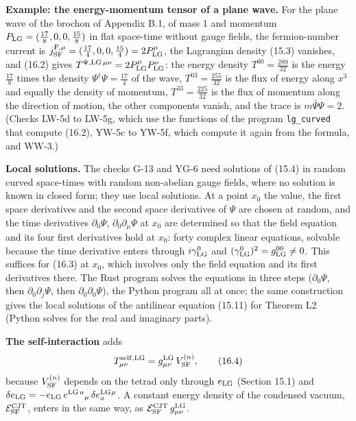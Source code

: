 \documentclass[
  10pt,
]{article}
\begin{document}
\textbf{Example: the energy-momentum tensor of a plane wave.} For the
plane wave of the brochon of Appendix B.1, of mass 1 and momentum
\(P_{\rm LG}=(\tfrac{17}{8},0,0,\tfrac{15}{8})\) in flat space-time
without gauge fields, the fermion-number current is
\(j^{{\rm F},\mu}_{\rm SF}=(\tfrac{17}{4},0,0,\tfrac{15}{4})=2P^\mu_{\rm LG}\),
the Lagrangian density (15.3) vanishes, and (16.2) gives
\(T^{\Psi,{\rm LG}\,\mu\nu}=2P^\mu_{\rm LG}P^\nu_{\rm LG}\): the energy
density \(T^{00}=\tfrac{289}{32}\) is the energy \(\tfrac{17}8\) times
the density \(\Psi^\dagger\Psi=\tfrac{17}4\) of the wave,
\(T^{03}=\tfrac{255}{32}\) is the flux of energy along \(x^3\) and
equally the density of momentum, \(T^{33}=\tfrac{225}{32}\) is the flux
of momentum along the direction of motion, the other components vanish,
and the trace is \(m\bar\Psi\Psi=2\). (Checks LW-5d to LW-5g, which use
the functions of the program \texttt{lg\_curved} that compute (16.2),
YW-5c to YW-5f, which compute it again from the formula, and WW-3.)

\textbf{Local solutions.} The checks G-13 and YG-6 need solutions of
(15.4) in random curved space-times with random non-abelian gauge
fields, where no solution is known in closed form; they use local
solutions. At a point \(x_0\) the value, the first space derivatives and
the second space derivatives of \(\Psi\) are chosen at random, and the
time derivatives \(\partial_0\Psi\), \(\partial_0\partial_\mu\Psi\) at
\(x_0\) are determined so that the field equation and its four first
derivatives hold at \(x_0\): forty complex linear equations, solvable
because the time derivative enters through \(i\gamma^0_{\rm LG}\) and
\((\gamma^0_{\rm LG})^2=g_{\rm LG}^{00}\ne0\). This suffices for (16.3)
at \(x_0\), which involves only the field equation and its first
derivatives there. The Rust program solves the equations in three steps
(\(\partial_0\Psi\), then \(\partial_0\partial_j\Psi\), then
\(\partial_0\partial_0\Psi\)), the Python program all at once; the same
construction gives the local solutions of the antilinear equation
(15.11) for Theorem L2 (Python solves for the real and imaginary parts).

\textbf{The self-interaction} adds
\[T^{\rm self,LG}_{\mu\nu}=g^{\rm LG}_{\mu\nu}\,V^{(n)}_{\rm SF},\tag{16.4}\]
because \(V^{(n)}_{\rm SF}\) depends on the tetrad only through
\(e_{\rm LG}\) (Section 15.1) and
\(\delta e_{\rm LG}=-e_{\rm LG}\,e^{{\rm LG}\,a}{}_\mu\,\delta e^{\rm LG}_a{}^\mu\).
A constant energy density of the condensed vacuum,
\(\mathcal E^{\rm CJT}_{\rm SF}\), enters in the same way, as
\(\mathcal E^{\rm CJT}_{\rm SF}\,g^{\rm LG}_{\mu\nu}\).
\end{document}

